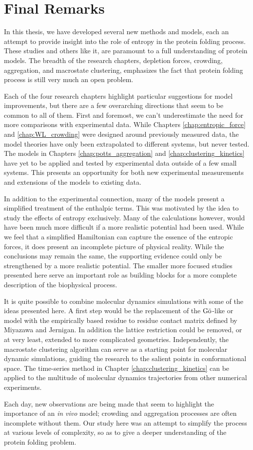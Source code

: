\chapter{Final Remarks}
%
In this thesis, we have developed several new methods and models, each an attempt to provide insight into the role of entropy in the protein folding process. These studies and others like it, are paramount to a full understanding of protein models. The breadth of the research chapters, depletion forces, crowding, aggregation, and macrostate clustering, emphasizes the fact that protein folding process is still very much an open problem. 

Each of the four research chapters highlight particular suggestions for model improvements, but there are a few overarching directions that seem to be common to all of them. First and foremost, we can't underestimate the need for more comparisons with experimental data. While Chapters \ref{chap:entropic_force} and \ref{chap:WL_crowding} were designed around previously measured data, the model theories have only been extrapolated to different systems, but never tested. The models in Chapters \ref{chap:potts_aggregation} and \ref{chap:clustering_kinetics} have yet to be applied and tested by experimental data outside of a few small systems. This presents an opportunity for both new experimental measurements and extensions of the models to existing data.

In addition to the experimental connection, many of the models present a simplified treatment of the enthalpic terms. This was motivated by the idea to study the effects of entropy exclusively. Many of the calculations however, would have been much more difficult if a more realistic potential had been used. While we feel that a simplified Hamiltonian can capture the essence of the entropic forces, it does present an incomplete picture of physical reality. While the conclusions may remain the same, the supporting evidence could only be strengthened by a more realistic potential. The smaller more focused studies presented here serve an important role as building blocks for a more complete description of the biophysical process. 

It is quite possible to combine molecular dynamics simulations with some of the  ideas presented here. A first step would be the replacement of the $\text{G}\bar{\text{o}}$-like or  model with the empirically based residue to residue contact matrix defined by Miyazawa and Jernigan.\cite{miyazawa_rl:empirical_1999} In addition the lattice restriction could be removed, or at very least, extended to more complicated geometries. Independently, the macrostate clustering algorithm can serve as a starting point for molecular dynamic simulations, guiding the research to the salient points in conformational space. The time-series method in Chapter \ref{chap:clustering_kinetics} can be applied to the multitude of molecular dynamics trajectories from other numerical experiments.

Each day, new observations are being made that seem to highlight the importance of an \textit{in vivo} model; crowding and aggregation processes are often incomplete without them. Our study here was an attempt to simplify the process at various levels of complexity, so as to give a deeper understanding of the protein folding problem.
